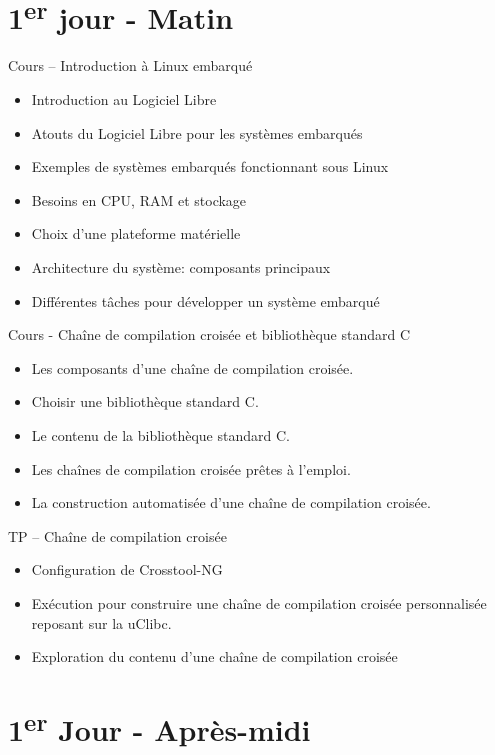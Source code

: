 \documentclass[a4paper,12pt,obeyspaces,spaces,hyphens]{article}
\begin{document}
\section{1\textsuperscript{er} jour - Matin}

\feagendaonecolumn
{Cours – Introduction à Linux embarqué}
{
  \begin{itemize}
  \item Introduction au Logiciel Libre
  \item Atouts du Logiciel Libre pour les systèmes embarqués
  \item Exemples de systèmes embarqués fonctionnant sous Linux
  \item Besoins en CPU, RAM et stockage
  \item Choix d'une plateforme matérielle
  \item Architecture du système: composants principaux
  \item Différentes tâches pour développer un système embarqué
  \end{itemize}
}

\feagendatwocolumn
{Cours - Chaîne de compilation croisée et bibliothèque standard C}
{
  \begin{itemize}
  \item Les composants d'une chaîne de compilation croisée.
  \item Choisir une bibliothèque standard C.
  \item Le contenu de la bibliothèque standard C.
  \item Les chaînes de compilation croisée prêtes à l'emploi.
  \item La construction automatisée d'une chaîne de compilation croisée.
  \end{itemize}
}
{TP – Chaîne de compilation croisée}
{
  \begin{itemize}
  \item Configuration de Crosstool-NG
  \item Exécution pour construire une chaîne de compilation croisée
    personnalisée reposant sur la uClibc.
  \item Exploration du contenu d'une chaîne de compilation croisée
  \end{itemize}
}

\section{1\textsuperscript{er} Jour - Après-midi}
\end{document}
